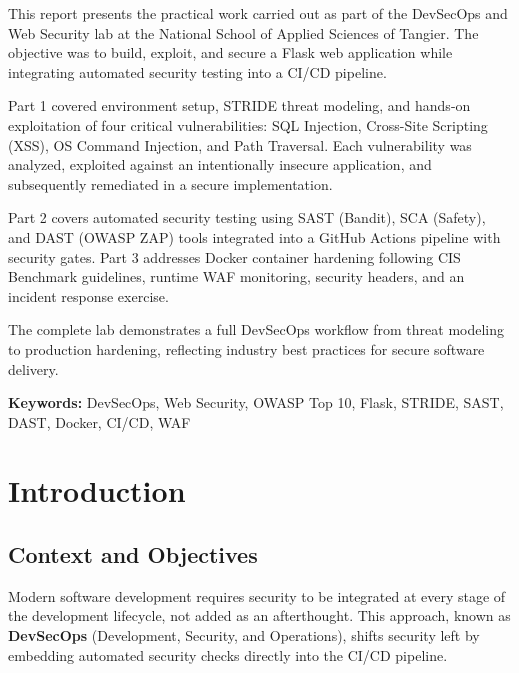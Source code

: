 \documentclass[12pt,a4paper]{report}
\begin{document}
This report presents the practical work carried out as part of the DevSecOps and Web Security lab at the National School of Applied Sciences of Tangier. The objective was to build, exploit, and secure a Flask web application while integrating automated security testing into a CI/CD pipeline.

Part 1 covered environment setup, STRIDE threat modeling, and hands-on exploitation of four critical vulnerabilities: SQL Injection, Cross-Site Scripting (XSS), OS Command Injection, and Path Traversal. Each vulnerability was analyzed, exploited against an intentionally insecure application, and subsequently remediated in a secure implementation.

Part 2 covers automated security testing using SAST (Bandit), SCA (Safety), and DAST (OWASP ZAP) tools integrated into a GitHub Actions pipeline with security gates. Part 3 addresses Docker container hardening following CIS Benchmark guidelines, runtime WAF monitoring, security headers, and an incident response exercise.

The complete lab demonstrates a full DevSecOps workflow from threat modeling to production hardening, reflecting industry best practices for secure software delivery.

\vspace{1cm}
\textbf{Keywords:} DevSecOps, Web Security, OWASP Top 10, Flask, STRIDE, SAST, DAST, Docker, CI/CD, WAF

\tableofcontents
\thispagestyle{fancy}


\clearpage
{}
\setcounter{page}{1}
\chapter{Introduction}

\section{Context and Objectives}

Modern software development requires security to be integrated at every stage of the development lifecycle, not added as an afterthought. This approach, known as \textbf{DevSecOps} (Development, Security, and Operations), shifts security left by embedding automated security checks directly into the CI/CD pipeline.
\end{document}
